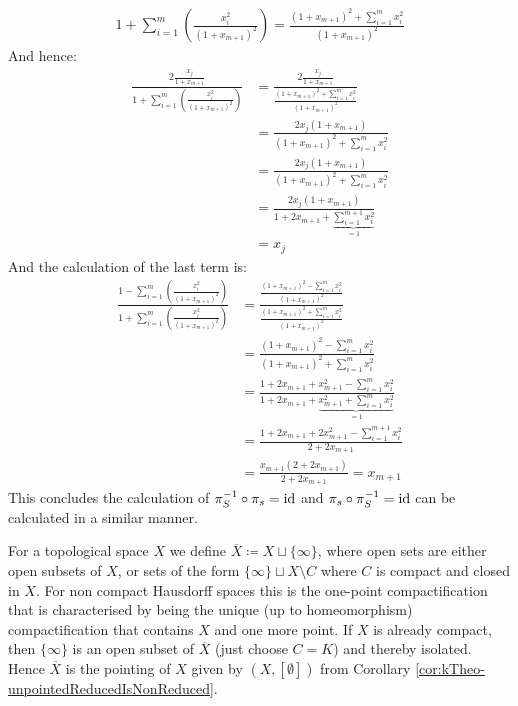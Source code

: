 \begin{definition}
    \begin{align*}
        1+\sum_{i=1}^m(\frac{x_i^2}{(1+x_{m+1})^2})=\frac{(1+x_{m+1})^2+\sum_{i=1}^m x_i^2}{(1+x_{m+1})^2}
    \end{align*} And hence:
    \begin{align}
        \frac{2\frac{x_j}{1+x_{m+1}}}{1+\sum_{i=1}^m(\frac{x_i^2}{(1+x_{m+1})^2})}& = \frac{2\frac{x_j}{1+x_{m+1}}}{\frac{(1+x_{m+1})^2+\sum_{i=1}^m x_i^2}{(1+x_{m+1})^2}} \\
        & =\frac{2x_j(1+x_{m+1})}{(1+x_{m+1})^2+\sum_{i=1}^m x_i^2} \\
        & =\frac{2x_j(1+x_{m+1})}{(1+x_{m+1})^2+\sum_{i=1}^m x_i^2}\\
        & = \frac{2x_j(1+x_{m+1})}{1+2 x_{m+1}+\underbrace{\sum_{i=1}^{m+1} x_i^2}_{=1}} \\
        & = x_j
    \end{align}
    And the calculation of the last term is:
    \begin{align*}
        \frac{1-\sum_{i=1}^m(\frac{x_i^2}{(1+x_{m+1})^2})}{1+\sum_{i=1}^m(\frac{x_i^2}{(1+x_{m+1})^2})} 
        & = \frac{\frac{(1+x_{m+1})^2-\sum_{i=1}^m x_i^2}{(1+x_{m+1})^2}}{\frac{(1+x_{m+1})^2+\sum_{i=1}^m x_i^2}{(1+x_{m+1})^2}}\\
        & =\frac{(1+x_{m+1})^2-\sum_{i=1}^m x_i^2}{(1+x_{m+1})^2+\sum_{i=1}^m x_i^2} \\
        & = \frac{1+2x_{m+1}+x_{m+1}^2-\sum_{i=1}^m x_i^2}{1+2x_{m+1}+\underbrace{x_{m+1}^2+\sum_{i=1}^m x_i^2}_{=1}} \\
        & = \frac{1+2x_{m+1}+2x_{m+1}^2-\sum_{i=1}^{m+1} x_i^2}{2+2x_{m+1}} \\
        & = \frac{x_{m+1}(2+2x_{m+1})}{2+2x_{m+1}}=x_{m+1}
    \end{align*}
This concludes the calculation of $\pi_S^{-1}\circ \pi_s=\operatorname{\mathrm{id}}$ and $\pi_s\circ\pi_S^{-1}=\operatorname{\mathrm{id}}$ can be calculated in a similar manner.
\end{definition}
\begin{definition}\label{def:kTheo-onePointCompactification}
	For a topological space $X$ we define $\overline{X}\coloneq X\sqcup \{\infty\}$, where open sets are either open subsets of $X$, or sets of the form $\{\infty\} \sqcup X\setminus C$ where $C$ is compact and closed in $X$. For non compact Hausdorff spaces this is the one-point compactification that is characterised by being the unique (up to homeomorphism) compactification that contains $X$ and one more point. If $X$ is already compact, then $\{\infty\}$ is an open subset of $\overline{X}$ (just choose $C=K$) and thereby isolated. Hence $ \overline{X}$ is the pointing of $X$ given by $(X,[\emptyset])$ from Corollary \ref{cor:kTheo-unpointedReducedIsNonReduced}.
\end{definition}
